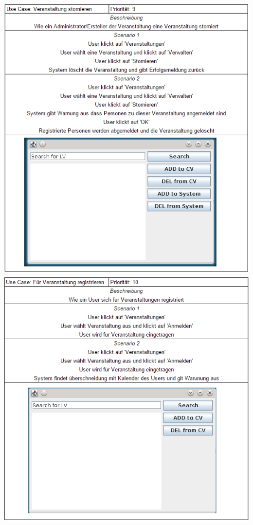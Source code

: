 \documentclass[a4paper,12pt]{article}
\begin{document}
\begin{center}
		\includegraphics[scale=.8]{UCCancelHappening.png}
		\includegraphics[scale=.8]{UCRegisterForHappening.png}

\end{center}
\end{document}
